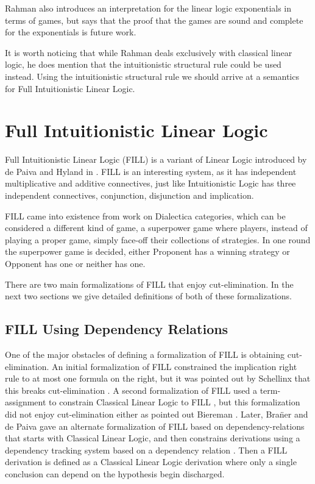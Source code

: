 \documentclass{article}
\begin{document}
 
Rahman also introduces an interpretation for the linear logic
exponentials in terms of games, but says that the proof that the games
are sound and complete for the exponentials is future work.
 
It is worth noticing that while Rahman deals exclusively with
classical linear logic, he does mention that the intuitionistic
structural rule could be used instead. Using the intuitionistic
structural rule we should arrive at a semantics for Full
Intuitionistic Linear Logic.
 
\section*{Full Intuitionistic Linear Logic}

Full Intuitionistic Linear Logic (FILL) is a variant of Linear Logic
introduced by de Paiva and Hyland in \cite{Hyland:1993}. FILL is an
interesting system, as it has independent multiplicative and additive
connectives, just like Intuitionistic Logic has three independent
connectives, conjunction, disjunction and implication.

FILL came into existence from work on Dialectica categories, which can
be considered a different kind of game, a superpower game where
players, instead of playing a proper game, simply face-off their
collections of strategies. In one round the superpower game is
decided, either Proponent has a winning strategy or Opponent has one
or neither has one.

There are two main formalizations of FILL that enjoy cut-elimination.
In the next two sections we give detailed definitions of both of these
formalizations.

\subsection*{FILL Using Dependency Relations}
\label{subsec:fill_using_dependency_relations}
One of the major obstacles of defining a formalization of FILL is
obtaining cut-elimination.  An initial formalization of FILL
constrained the implication right rule to at most one formula on the
right, but it was pointed out by Schellinx that this breaks
cut-elimination \cite{Schellinx:1991}.  A second formalization of FILL
used a term-assignment to constrain Classical Linear Logic to FILL
\cite{Hyland:1993}, but this formalization did not enjoy
cut-elimination either as pointed out Biereman \cite{Bierman:1996a}.
Later, Bra\"ner and de Paiva gave an alternate formalization of FILL
based on dependency-relations that starts with Classical Linear Logic,
and then constrains derivations using a dependency tracking system
based on a dependency relation \cite{Brauner:1998}.  Then a FILL
derivation is defined as a Classical Linear Logic derivation where
only a single conclusion can depend on the hypothesis begin
discharged.
\end{document}
